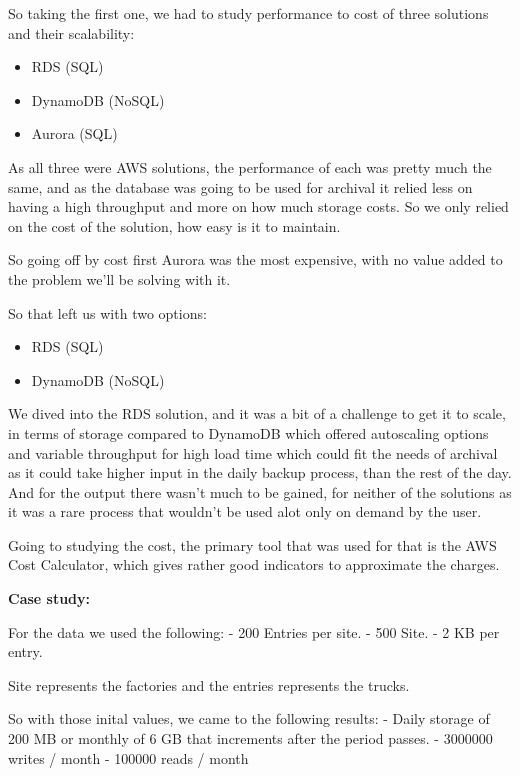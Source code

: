 So taking the first one, we had to study performance to cost of three solutions and their scalability:

    \begin{itemize}
        \item RDS (SQL)
        \item DynamoDB (NoSQL)
        \item Aurora (SQL)
    \end{itemize}

As all three were AWS solutions, the performance of each was pretty much the same,
and as the database was going to be used for archival it relied less on having a
high throughput and more on how much storage costs.
So we only relied on the cost of the solution, how easy is it to maintain.

So going off by cost first Aurora was the most expensive, with no value added to the problem we'll be solving with it.

So that left us with two options:

    \begin{itemize}
        \item RDS (SQL)
        \item DynamoDB (NoSQL)
    \end{itemize}

We dived into the RDS solution, and it was a bit of a challenge to get it to scale,
in terms of storage compared to DynamoDB which offered autoscaling options and variable
throughput for high load time which could fit the needs of archival as it could take 
higher input in the daily backup process, than the rest of the day.
And for the output there wasn't much to be gained, for neither of the solutions as it was
a rare process that wouldn't be used alot only on demand by the user.

Going to studying the cost, the primary tool that was used for that is the AWS Cost Calculator, which gives rather good indicators to approximate the charges.

\textbf{Case study: }

For the data we used the following:
- 200 Entries per site.
- 500 Site.
- 2 KB per entry.

Site represents the factories and the entries represents the trucks.

So with those inital values, we came to the following results:
- Daily storage of 200 MB or monthly of 6 GB that increments after the period passes.
- 3000000 writes / month
- 100000 reads / month

